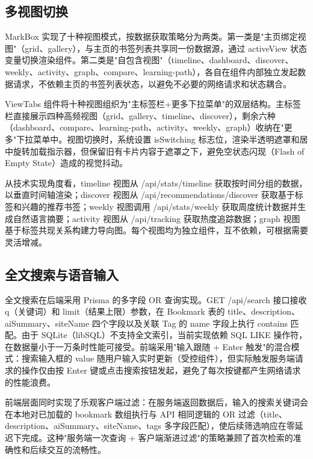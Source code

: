 \documentclass[a4paper,12pt]{ctexart}
\begin{document}
\subsection{多视图切换}

MarkBox 实现了十种视图模式，按数据获取策略分为两类。第一类是"主页绑定视图"（grid、gallery），与主页的书签列表共享同一份数据源，通过 activeView 状态变量切换渲染组件。第二类是"自包含视图"（timeline、dashboard、discover、weekly、activity、graph、compare、learning-path），各自在组件内部独立发起数据请求，不依赖主页的书签列表状态，以避免不必要的网络请求和状态耦合。

ViewTabs 组件将十种视图组织为"主标签栏+更多下拉菜单"的双层结构。主标签栏直接展示四种高频视图（grid、gallery、timeline、discover），剩余六种（dashboard、compare、learning-path、activity、weekly、graph）收纳在"更多"下拉菜单中。视图切换时，系统设置 isSwitching 标志位，渲染半透明遮罩和居中旋转加载指示器，但保留旧有卡片内容于遮罩之下，避免空状态闪现（Flash of Empty State）造成的视觉抖动。

从技术实现角度看，timeline 视图从 /api/stats/timeline 获取按时间分组的数据，以垂直时间轴渲染；discover 视图从 /api/recommendations/discover 获取基于标签和兴趣的推荐书签；weekly 视图调用 /api/stats/weekly 获取周度统计数据并生成自然语言摘要；activity 视图从 /api/tracking 获取热度追踪数据；graph 视图基于标签共现关系构建力导向图。每个视图均为独立组件，互不依赖，可根据需要灵活增减。


\subsection{全文搜索与语音输入}

全文搜索在后端采用 Prisma 的多字段 OR 查询实现。GET /api/search 接口接收 q（关键词）和 limit（结果上限）参数，在 Bookmark 表的 title、description、aiSummary、siteName 四个字段以及关联 Tag 的 name 字段上执行 contains 匹配。由于 SQLite（libSQL）不支持全文索引，当前实现依赖 SQL LIKE 操作符，在数据量小于一万条时性能可接受。前端采用"输入跟随 + Enter 触发"的混合模式：搜索输入框的 value 随用户输入实时更新（受控组件），但实际触发服务端请求的操作仅由按 Enter 键或点击搜索按钮发起，避免了每次按键都产生网络请求的性能浪费。

前端层面同时实现了乐观客户端过滤：在服务端返回数据后，输入的搜索关键词会在本地对已加载的 bookmark 数组执行与 API 相同逻辑的 OR 过滤（title、description、aiSummary、siteName、tags 多字段匹配），使后续筛选响应在零延迟下完成。这种"服务端一次查询 + 客户端渐进过滤"的策略兼顾了首次检索的准确性和后续交互的流畅性。
\end{document}
